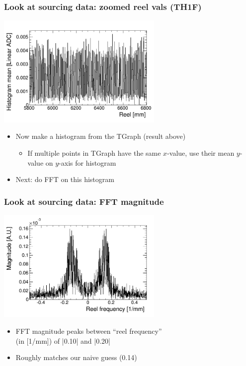 \documentclass[bigger]{beamer}
\begin{document}
\begin{frame}
\frametitle{Look at sourcing data: zoomed reel vals (TH1F)}
\label{sec-3-1-5}
\label{sec-3-1-5-1}

\centering
\includegraphics[width=0.6\textwidth]{fig/original_histogram.png}
\begin{itemize}

\item Now make a histogram from the TGraph (result above)
\label{sec-3-1-5-2}%
\begin{itemize}

\item If multiple points in TGraph have the same $x$-value, use their mean $y$-value on $y$-axis for histogram
\label{sec-3-1-5-2-1}%
\end{itemize} %

\item Next: do FFT on this histogram
\label{sec-3-1-5-3}%
\end{itemize} %
\end{frame}
\begin{frame}
\frametitle{Look at sourcing data: FFT magnitude}
\label{sec-3-1-6}
\label{sec-3-1-6-1}

\centering
\includegraphics[width=0.6\textwidth]{fig/FFT_magnitude.png}
\begin{itemize}

\item FFT magnitude peaks between ``reel frequency''\\
\label{sec-3-1-6-2}%
(in [1/mm]) of |0.10| and |0.20|

\item Roughly matches our naive guess (0.14)
\label{sec-3-1-6-3}%
\end{itemize} %
\end{frame}
\end{document}
